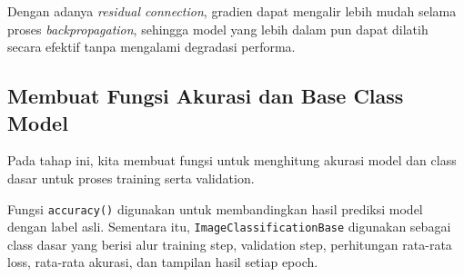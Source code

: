 Dengan adanya \textit{residual connection}, gradien dapat mengalir lebih mudah selama proses \textit{backpropagation}, sehingga model yang lebih dalam pun dapat dilatih secara efektif tanpa mengalami degradasi performa.

\subsection{Membuat Fungsi Akurasi dan Base Class Model}

Pada tahap ini, kita membuat fungsi untuk menghitung akurasi model dan class dasar untuk proses training serta validation.

Fungsi \texttt{accuracy()} digunakan untuk membandingkan hasil prediksi model dengan label asli. Sementara itu, \texttt{ImageClassificationBase} digunakan sebagai class dasar yang berisi alur training step, validation step, perhitungan rata-rata loss, rata-rata akurasi, dan tampilan hasil setiap epoch.

